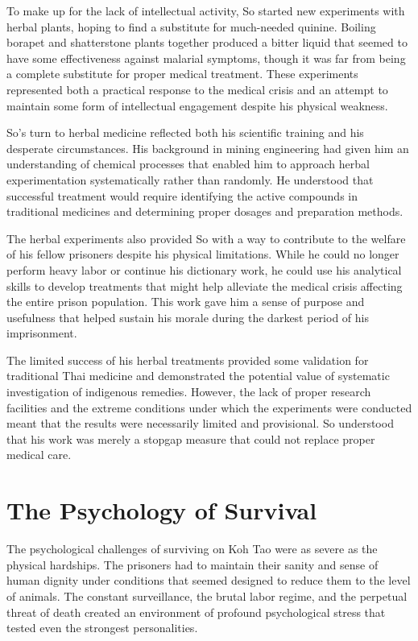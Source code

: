 \documentclass[
  Letterpaper,
]{scrbook}
\begin{document}
To make up for the lack of intellectual activity, So started new
experiments with herbal plants, hoping to find a substitute for
much-needed quinine. Boiling borapet and shatterstone plants together
produced a bitter liquid that seemed to have some effectiveness against
malarial symptoms, though it was far from being a complete substitute
for proper medical treatment. These experiments represented both a
practical response to the medical crisis and an attempt to maintain some
form of intellectual engagement despite his physical weakness.

So's turn to herbal medicine reflected both his scientific training and
his desperate circumstances. His background in mining engineering had
given him an understanding of chemical processes that enabled him to
approach herbal experimentation systematically rather than randomly. He
understood that successful treatment would require identifying the
active compounds in traditional medicines and determining proper dosages
and preparation methods.

The herbal experiments also provided So with a way to contribute to the
welfare of his fellow prisoners despite his physical limitations. While
he could no longer perform heavy labor or continue his dictionary work,
he could use his analytical skills to develop treatments that might help
alleviate the medical crisis affecting the entire prison population.
This work gave him a sense of purpose and usefulness that helped sustain
his morale during the darkest period of his imprisonment.

The limited success of his herbal treatments provided some validation
for traditional Thai medicine and demonstrated the potential value of
systematic investigation of indigenous remedies. However, the lack of
proper research facilities and the extreme conditions under which the
experiments were conducted meant that the results were necessarily
limited and provisional. So understood that his work was merely a
stopgap measure that could not replace proper medical care.

\section{The Psychology of Survival}\label{the-psychology-of-survival}

The psychological challenges of surviving on Koh Tao were as severe as
the physical hardships. The prisoners had to maintain their sanity and
sense of human dignity under conditions that seemed designed to reduce
them to the level of animals. The constant surveillance, the brutal
labor regime, and the perpetual threat of death created an environment
of profound psychological stress that tested even the strongest
personalities.
\end{document}
